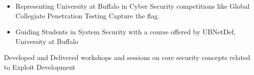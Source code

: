 


{}

\begin{itemize}
\item Representing University at Buffalo in Cyber Security competitions like Global Collegiate Penetration Testing Capture the flag.
\item Guiding Students in System Security with a course offered by UBNetDef, University at Buffalo
\end{itemize}

\smallskip
\divider
\smallskip
{}
Developed and Delivered workshops and sessions on core security concepts related to Exploit Development\\

\smallskip

